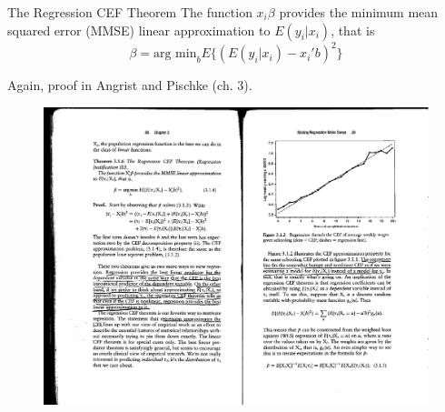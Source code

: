 \documentclass[notes=show]{beamer}
\begin{document}
\begin{frame}[plain]
	
	\begin{block}{The Regression CEF Theorem}
	The function $x_i\beta$ provides the minimum mean squared error (MMSE) linear approximation to $E(y_i | x_i)$, that is $$\beta = \text{arg min}_b E \{ ( E(y_i | x_i ) - x_i'b)^2\}$$
	\end{block}

Again, proof in Angrist and Pischke (ch. 3).
	
\end{frame}

\begin{frame}[plain]

	\begin{figure}[h]
	\includegraphics[scale=0.85]{./lecture_includes/mhe_312.pdf}
	\end{figure}

\end{frame}
\end{document}

